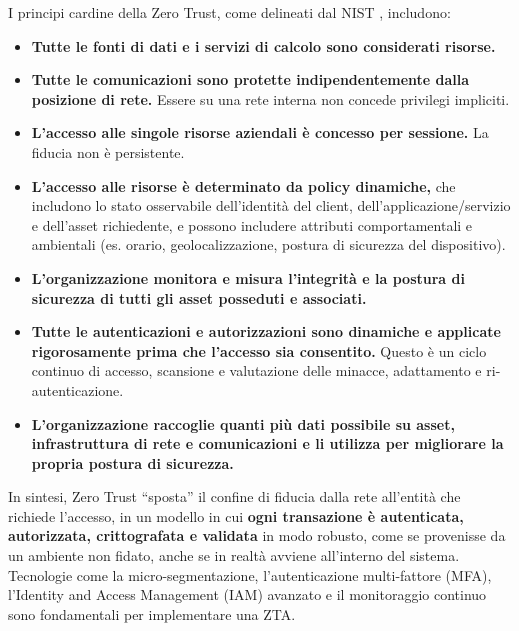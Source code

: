 I principi cardine della Zero Trust, come delineati dal NIST \cite{nistZeroTrust}, includono:
\begin{itemize}
    \item \textbf{Tutte le fonti di dati e i servizi di calcolo sono considerati risorse.}
    \item \textbf{Tutte le comunicazioni sono protette indipendentemente dalla posizione di rete.} Essere su una rete interna non concede privilegi impliciti.
    \item \textbf{L'accesso alle singole risorse aziendali è concesso per sessione.} La fiducia non è persistente.
    \item \textbf{L'accesso alle risorse è determinato da policy dinamiche,} che includono lo stato osservabile dell'identità del client, dell'applicazione/servizio e dell'asset richiedente, e possono includere attributi comportamentali e ambientali (es. orario, geolocalizzazione, postura di sicurezza del dispositivo).
    \item \textbf{L'organizzazione monitora e misura l'integrità e la postura di sicurezza di tutti gli asset posseduti e associati.}
    \item \textbf{Tutte le autenticazioni e autorizzazioni sono dinamiche e applicate rigorosamente prima che l'accesso sia consentito.} Questo è un ciclo continuo di accesso, scansione e valutazione delle minacce, adattamento e ri-autenticazione.
    \item \textbf{L'organizzazione raccoglie quanti più dati possibile su asset, infrastruttura di rete e comunicazioni e li utilizza per migliorare la propria postura di sicurezza.}
\end{itemize}
In sintesi, Zero Trust “sposta” il confine di fiducia dalla rete all’entità che richiede l’accesso, in un modello in cui \textbf{ogni transazione è autenticata, autorizzata, crittografata e validata} in modo robusto, come se provenisse da un ambiente non fidato, anche se in realtà avviene all’interno del sistema. Tecnologie come la micro-segmentazione, l'autenticazione multi-fattore (MFA), l'Identity and Access Management (IAM) avanzato e il monitoraggio continuo sono fondamentali per implementare una ZTA.

